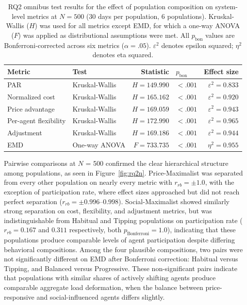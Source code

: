\documentclass[11pt, a4paper]{article}
\begin{document}
\begin{table}
    \caption{RQ2 omnibus test results for the effect of population composition on system-level metrics at $N = 500$ (30 days per population, 6 populations).
    Kruskal-Wallis ($H$) was used for all metrics except EMD, for which a one-way ANOVA ($F$) was applied as distributional assumptions were met.
    All $p_{\text{bon}}$ values are Bonferroni-corrected across six metrics ($\alpha = .05$).
    $\varepsilon^2$ denotes epsilon squared; $\eta^2$ denotes eta squared.}
    \label{tab:rq2_omnibus}
    \centering
    \small
    \begin{tabular}{l l r l r}
        \toprule
        Metric & Test & Statistic & $p_{\text{bon}}$ & Effect size \\
        \midrule
        PAR                   & Kruskal-Wallis & $H = 149.990$ & $< .001$ & $\varepsilon^2 = 0.833$ \\
        Normalized cost       & Kruskal-Wallis & $H = 165.162$ & $< .001$ & $\varepsilon^2 = 0.920$ \\
        Price advantage       & Kruskal-Wallis & $H = 169.059$ & $< .001$ & $\varepsilon^2 = 0.943$ \\
        Per-agent flexibility & Kruskal-Wallis & $H = 172.990$ & $< .001$ & $\varepsilon^2 = 0.965$ \\
        Adjustment            & Kruskal-Wallis & $H = 169.186$ & $< .001$ & $\varepsilon^2 = 0.944$ \\
        EMD                   & One-way ANOVA  & $F = 733.735$ & $< .001$ & $\eta^2 = 0.955$ \\
        \bottomrule
    \end{tabular}
\end{table}

Pairwise comparisons at $N$ = 500 confirmed the clear hierarchical structure among populations, as seen in Figure~\ref{fig:rq2n}. Price-Maximalist was separated from every other population on nearly every metric with $r_{rb} = \pm 1.0$, with the exception of participation rate, where effect sizes approached but did not reach perfect separation ($r_{rb} = \pm 0.996$--$0.998$). Social-Maximalist showed similarly strong separation on cost, flexibility, and adjustment metrics, but was indistinguishable from Habitual and Tipping populations on participation rate ($r_{rb} = 0.167$ and $0.311$ respectively, both $p_{\text{Bonferroni}} = 1.0$), indicating that these populations produce comparable levels of agent participation despite differing behavioral compositions. Among the four plausible compositions, two pairs were not significantly different on EMD after Bonferroni correction: Habitual versus Tipping, and Balanced versus Progressive. These non-significant pairs indicate that populations with similar shares of actively shifting agents produce comparable aggregate load deformation, when the balance between price-responsive and social-influenced agents differs slightly.
\end{document}
